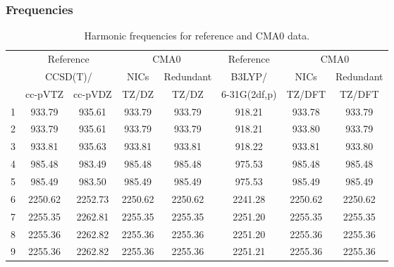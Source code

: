 \documentclass[10pt,oneside]{article}
\begin{document}
\begin{table}[h!]
\subsubsection*{Frequencies}
\centering
\caption{Harmonic frequencies for reference and CMA0 data.}
\begin{tabular}{cccccccc}
\toprule
{} & \multicolumn{2}{c}{Reference} & \multicolumn{2}{c}{CMA0} &    Reference & \multicolumn{2}{c}{CMA0} \\
{} & \multicolumn{2}{c}{CCSD(T)/} &    NICs &  Redundant &       B3LYP/ &    NICs & Redundant \\
{} &   cc-pVTZ & cc-pVDZ &   TZ/DZ &      TZ/DZ & 6-31G(2df,p) &  TZ/DFT &    TZ/DFT \\
\midrule
1 &    933.79 &  935.61 &  933.79 &     933.79 &       918.21 &  933.78 &    933.79 \\
2 &    933.79 &  935.61 &  933.79 &     933.79 &       918.21 &  933.80 &    933.79 \\
3 &    933.81 &  935.63 &  933.81 &     933.81 &       918.22 &  933.81 &    933.80 \\
4 &    985.48 &  983.49 &  985.48 &     985.48 &       975.53 &  985.48 &    985.48 \\
5 &    985.49 &  983.50 &  985.49 &     985.49 &       975.53 &  985.49 &    985.49 \\
6 &   2250.62 & 2252.73 & 2250.62 &    2250.62 &      2241.28 & 2250.62 &   2250.62 \\
7 &   2255.35 & 2262.81 & 2255.35 &    2255.35 &      2251.20 & 2255.35 &   2255.35 \\
8 &   2255.36 & 2262.82 & 2255.36 &    2255.36 &      2251.20 & 2255.36 &   2255.36 \\
9 &   2255.36 & 2262.82 & 2255.36 &    2255.36 &      2251.21 & 2255.36 &   2255.36 \\
\bottomrule
\end{tabular}
\end{table}
\end{document}
